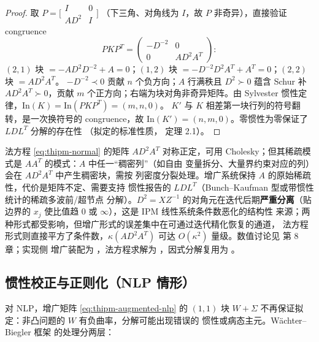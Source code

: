 \begin{proof}
取 $P=\bigl[\begin{smallmatrix} I & 0\\ AD^{2} & I\end{smallmatrix}\bigr]$
（下三角、对角线为 $I$，故 $P$ 非奇异），直接验证 congruence
\begin{equation*}
  P K P^{T}
  =
  \begin{pmatrix} -D^{-2} & 0\\ 0 & AD^{2}A^{T}\end{pmatrix}:
\end{equation*}
$(2,1)$ 块 $=-AD^{2}D^{-2}+A=0$；$(1,2)$ 块
$=-D^{-2}D^{2}A^{T}+A^{T}=0$；$(2,2)$ 块 $=AD^{2}A^{T}$。
$-D^{-2}\prec0$ 贡献 $n$ 个负方向；$A$ 行满秩且 $D^{2}\succ0$ 蕴含 Schur
补 $AD^{2}A^{T}\succ0$，贡献 $m$ 个正方向；右端为块对角非奇异矩阵。由
Sylvester 惯性定律，$\mathrm{In}(K)=\mathrm{In}(PKP^{T})=(m,n,0)$。
$K'$ 与 $K$ 相差第一块行列的符号翻转，是一次换符号的 congruence，故
$\mathrm{In}(K')=(n,m,0)$。零惯性为零保证了 $LDL^{T}$ 分解的存在性
（拟定的标准性质，\cite{ipmvanderbei1995} 定理 2.1）。
\end{proof}

\begin{remark}\label{rem:thipm-ne-vs-aug}
法方程 \eqref{eq:thipm-normal} 的矩阵 $AD^{2}A^{T}$ 对称正定，可用
Cholesky；但其稀疏模式是 $AA^{T}$ 的模式：$A$ 中任一``稠密列''（如自由
变量拆分、大量界约束对应的列）会在 $AD^{2}A^{T}$ 中产生稠密块，需按
列密度分裂处理。增广系统保持 $A$ 的原始稀疏性，代价是矩阵不定、需要支持
惯性报告的 $LDL^{T}$（Bunch--Kaufman 型或带惯性统计的稀疏多波前/超节点
分解）。$D^{2}=XZ^{-1}$ 的对角元在迭代后期\textbf{严重分离}（贴边界的
$x_j$ 使比值趋 $0$ 或 $\infty$），这是 IPM 线性系统条件数恶化的结构性
来源；两种形式都受影响，但增广形式的误差集中在可通过迭代精化恢复的通道，
法方程形式则直接平方了条件数，$\kappa(AD^{2}A^{T})$ 可达
$O(\kappa^{2})$ 量级。数值讨论见 \cite{ipmwright1997} 第 8 章；实现侧
增广装配为
，法方程求解为
，因式分解复用为
。
\end{remark}

\subsection{惯性校正与正则化（NLP 情形）}\label{subsec:thipm-inertia}

对 NLP，增广矩阵 \eqref{eq:thipm-augmented-nlp} 的 $(1,1)$ 块
$W+\Sigma$ 不再保证拟定：非凸问题的 $W$ 有负曲率，分解可能出现错误的
惯性或病态主元。W\"achter--Biegler 框架 \cite{ipmwachter2006} 的处理分两层：

